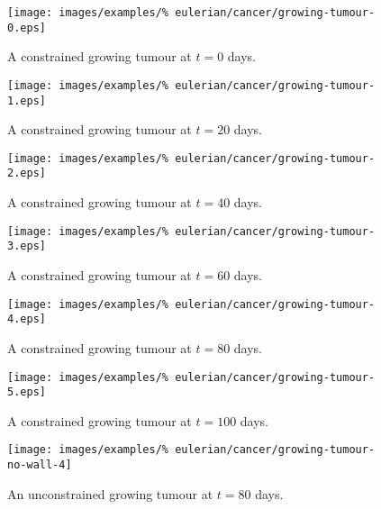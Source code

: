 \begin{figure}[!hptb]
\centering
\texttt{[image: images/examples/\%
eulerian/cancer/growing-tumour-0.eps]}
\caption{A constrained growing tumour at $t=0$ days.}
\label{tumour-growth-constrained-0}
\end{figure}

\begin{figure}[!hptb]
\centering
\texttt{[image: images/examples/\%
eulerian/cancer/growing-tumour-1.eps]}
\caption{A constrained growing tumour at $t=20$ days.}
\label{tumour-growth-constrained-1}
\end{figure}

\begin{figure}[!hptb]
\centering
\texttt{[image: images/examples/\%
eulerian/cancer/growing-tumour-2.eps]}
\caption{A constrained growing tumour at $t=40$ days.}
\label{tumour-growth-constrained-2}
\end{figure}

\begin{figure}[!hptb]
\centering
\texttt{[image: images/examples/\%
eulerian/cancer/growing-tumour-3.eps]}
\caption{A constrained growing tumour at $t=60$ days.}
\label{tumour-growth-constrained-3}
\end{figure}

\begin{figure}[!hptb]
\centering
\texttt{[image: images/examples/\%
eulerian/cancer/growing-tumour-4.eps]}
\caption{A constrained growing tumour at $t=80$ days.}
\label{tumour-growth-constrained-4}
\end{figure}

\begin{figure}[!hptb]
\centering
\texttt{[image: images/examples/\%
eulerian/cancer/growing-tumour-5.eps]}
\caption{A constrained growing tumour at $t=100$ days.}
\label{tumour-growth-constrained-5}
\end{figure}

\begin{figure}[!hptb]
\centering
\texttt{[image: images/examples/\%
eulerian/cancer/growing-tumour-no-wall-4]}
\caption{An unconstrained growing tumour at $t=80$ days.}
\label{tumour-growth-no-wall-4}
\end{figure}

%

